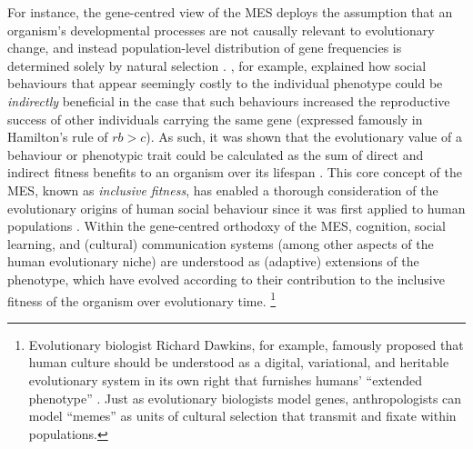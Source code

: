 \begin{CJK}{UTF8}{gbsn}
For instance, the gene-centred view of the MES deploys the assumption that an organism's developmental processes are not causally relevant to evolutionary change, and instead population-level distribution of gene frequencies is determined solely by natural selection \citep[including associated stochastic mechanisms of mutation, and genetic drift][]{Grafen1991}.  \textcite{Hamilton1964}, for example, explained how social behaviours that appear seemingly costly to the individual phenotype could be \textit{indirectly} beneficial in the case that such behaviours increased the reproductive success of other individuals carrying the same gene (expressed famously in Hamilton's rule of $rb > c$).  As such, it was shown that the evolutionary value of a behaviour or phenotypic trait could be calculated as the sum of direct and indirect fitness benefits to an organism over its lifespan \citep{Grafen2006}.  This core concept of the MES, known as \textit{inclusive fitness}, has enabled a thorough consideration of the evolutionary origins of human social behaviour since it was first applied to human populations \citep{Axelrod1981,West2011,Abbot2011}.  Within the gene-centred orthodoxy of the MES, cognition, social learning, and (cultural) communication systems (among other aspects of the human evolutionary niche) are understood as (adaptive) extensions of the phenotype, which have evolved according to their contribution to the inclusive fitness of the organism over evolutionary time.
  \footnote{Evolutionary biologist Richard Dawkins, for example, famously proposed that human culture should be understood as a digital, variational, and heritable evolutionary system in its own right that furnishes humans' ``extended phenotype'' \citep{Dawkins1982}.  Just as evolutionary biologists model genes, anthropologists can model ``memes'' as units of cultural selection that transmit and fixate within populations.}



\end{CJK}
